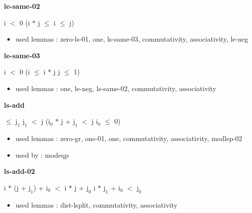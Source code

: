 \documentclass[a4paper]{article}
\begin{document}
\medskip

\bigskip

{\large\bf le-same-02}

\medskip

 \Fol i $<$ 0 \Imp (i $*$ j $\le$ i  $\le$ j)

\begin{itemize}


\item       used lemmas  : zero-ls-01, one, ls-same-03, commutativity, associativity, le-neg

\end{itemize}

\medskip

\bigskip

{\large\bf le-same-03}

\medskip

 \Fol i $<$ 0 \Imp (i $\le$ i $*$ j \Equiv j $\le$ 1)

\begin{itemize}


\item       used lemmas  : one, le-neg, ls-same-02, commutativity, associativity

\end{itemize}

\medskip

\bigskip

{\large\bf ls-add}

\medskip

  $\le$ $\mbox{j}_{1}$ \And $\mbox{j}_{1}$ $<$ j \Imp ($\mbox{i}_{0}$ $*$ j + $\mbox{j}_{1}$ $<$ j \Equiv $\mbox{i}_{0}$ $\le$ 0)

\begin{itemize}


\item       used lemmas  : zero-gr, one-01, one, commutativity, associativity, modlsp-02
\item       used by      : modeqp

\end{itemize}

\medskip

\bigskip

{\large\bf ls-add-02}

\medskip

 \Fol i $*$ (j + $\mbox{j}_{1}$) + $\mbox{i}_{0}$ $<$ i $*$ j + $\mbox{j}_{0}$ \Equiv i $*$ $\mbox{j}_{1}$ + $\mbox{i}_{0}$ $<$ $\mbox{j}_{0}$

\begin{itemize}


\item       used lemmas  : dist-lsplit, commutativity, associativity

\end{itemize}
\end{document}
